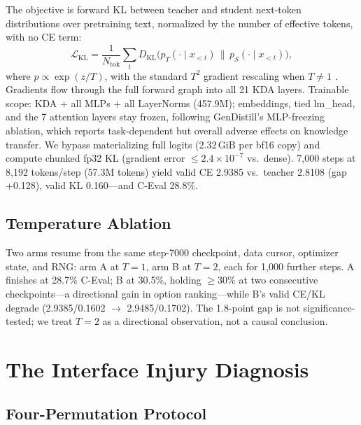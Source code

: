 \documentclass[11pt]{article}
\begin{document}
The objective is forward KL between teacher and student next-token
distributions over pretraining text, normalized by the number of
effective tokens, with no CE term:
\begin{equation}
\mathcal{L}_{\mathrm{KL}} = \frac{1}{N_{\mathrm{tok}}}\sum_{t} D_{\mathrm{KL}}\bigl(p_T(\cdot \mid x_{<t}) \,\|\, p_S(\cdot \mid x_{<t})\bigr),
\label{eq:kl}
\end{equation}
where $p \propto \exp(z/T)$, with the standard $T^2$ gradient rescaling
when $T \neq 1$ \citep{hinton2015distilling}. Gradients flow through
the full forward graph into all 21 KDA layers. Trainable scope: KDA +
all MLPs + all LayerNorms (457.9M); embeddings, tied lm\_head, and the
7 attention layers stay frozen, following GenDistill's MLP-freezing
ablation, which reports task-dependent but overall adverse effects on
knowledge transfer. We bypass materializing full logits
(2.32\,GiB per bf16 copy) and compute chunked fp32 KL (gradient error
$\le 2.4{\times}10^{-7}$ vs.\ dense). 7{,}000 steps at 8{,}192
tokens/step (57.3M tokens) yield valid CE 2.9385 vs.\ teacher 2.8108
(gap +0.128), valid KL 0.160---and C-Eval 28.8\%.

\subsection{Temperature Ablation}
\label{sec:temp}

Two arms resume from the same step-7000 checkpoint, data cursor,
optimizer state, and RNG: arm A at $T{=}1$, arm B at $T{=}2$, each for
1{,}000 further steps. A finishes at 28.7\% C-Eval; B at 30.5\%, holding
$\ge$30\% at two consecutive checkpoints---a directional gain in option
ranking---while B's valid CE/KL degrade (2.9385/0.1602 $\to$
2.9485/0.1702). The 1.8-point gap is not significance-tested; we treat
$T{=}2$ as a directional observation, not a causal conclusion.

\section{The Interface Injury Diagnosis}
\label{sec:diag}

\subsection{Four-Permutation Protocol}
\end{document}
